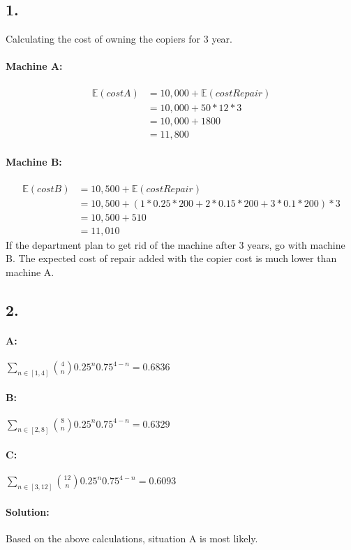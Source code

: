 \documentclass{article}
\begin{document}
\subsection*{1.}
Calculating the cost of owning the copiers for 3 year.
\paragraph{Machine A:}
\begin{align*}
	\mathbb{E}(costA) &= 10,000 + \mathbb{E}(costRepair) \\
										&= 10,000 + 50*12*3\\
										&= 10,000 + 1800\\
										&= 11,800
\end{align*}

\paragraph{Machine B:}
\begin{align*}
	\mathbb{E}(costB) &= 10,500 + \mathbb{E}(costRepair) \\
										&= 10,500 + (1*0.25*200 + 2*0.15*200 + 3*0.1*200)*3 \\
										&= 10,500 + 510 \\
										&= 11,010
\end{align*}
If the department plan to get rid of the machine after 3 years, go with machine
B. The expected cost of repair added with the copier cost is much lower than
machine A.

\subsection*{2.}
\paragraph{A: } $\sum_{n \in [1,4]}{4\choose n}0.25^n0.75^{4-n} = 0.6836$
\paragraph{B: } $\sum_{n \in [2,8]}{8\choose n}0.25^n0.75^{4-n} = 0.6329$
\paragraph{C: } $\sum_{n \in [3,12]}{12\choose n}0.25^n0.75^{4-n} = 0.6093$
\paragraph{Solution: } Based on the above calculations, situation A is most likely.
\end{document}
